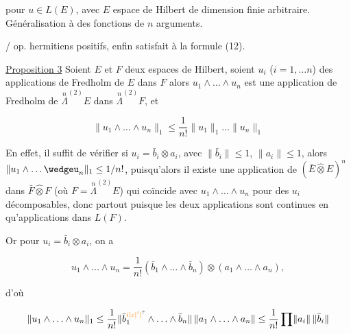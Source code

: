 pour  $u\in L(E)$, avec $E$ espace de Hilbert de dimension finie arbitraire. Généralisation à des fonctions de $n$ arguments.

/ op. hermitiens positifs, enfin satisfait à la formule (12).


\uline{Proposition 3} Soient $E$ et $F$ deux espaces de Hilbert, soient $u_i$ ($i=1,\ldots n$) des applications de Fredholm de $E$ dans $F$\unsure{;|,} alors $u_1\wedge\ldots\wedge u_n$ est une application de Fredholm de $\overset{n}{\Lambda}^{(2)}E$ dans $\overset{n}{\Lambda}^{(2)}F$, et

\[
\lVert u_1\wedge\ldots\wedge u_n\rVert_1\leq\frac1{n!}\lVert u_1\rVert_1\ldots\lVert u_n\rVert_1\tag*{(13)}
\]

En effet, il suffit de \deleted{\unsure{$\leq$}} vérifier  si  $u_i=\bar b_i\otimes a_i$,  avec $\lVert\bar b_i\rVert\leq1$, $\lVert a_i\rVert\leq1$, alors $\lVert u_1\wedge\ldots\wedgeu_n\rVert_1\leq1/n!$,  puisqu'alors il existe une application     de $(\bar E\widehat{\otimes}E)^n$ dans  $\bar F\widehat{\otimes}F$ (où $F=\overset{n}{\Lambda}^{(2)}E$) qui coïncide avec  $u_1\wedge\ldots\wedge u_n$ pour des $u_i$ décomposables, donc partout puisque les deux applications sont continues  en  qu'applications dans $L(F)$.

Or pour $u_i=\bar b_i\otimes a_i$, on a 

\[
u_1\wedge\ldots\wedge u_n=\frac1{n!}(\bar b_1\wedge\ldots\wedge\bar b_n)\otimes(a_1\wedge\ldots\wedge a_n),
\]

 d'où

\[
\lVert u_1\wedge\ldots\wedge u_n\rVert_1\leq\frac1{n!}\lVert\bar b_1^{\unsure{i|c|'|{}}}\wedge\ldots\wedge\bar b_n\rVert\,\lVert a_1\wedge\ldots\wedge a_n\rVert\leq\frac1{n!}\prod\lVert a_i\rVert\,\lVert\bar b_i\rVert
\]

